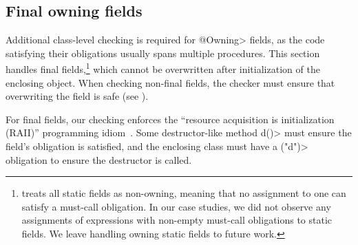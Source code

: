

\subsection{Final owning fields}
\label{sec:owning-fields}

  Additional class-level checking is required for \<@Owning>
  fields, as the code
  satisfying their \MustCall obligations usually spans multiple
  procedures.  This section handles final fields,\footnote{\Tool
    treats all static fields as non-owning, meaning that no assignment to one
    can satisfy a must-call obligation. In our case studies, we did
    not observe any assignments of expressions with non-empty must-call obligations
    to static fields. We leave handling owning static fields to future work.
  }
  which cannot be overwritten after initialization of the enclosing
  object.  When checking
  non-final fields, the checker must ensure
  that overwriting the field is safe
  (see ).

  For final fields, our checking enforces the ``resource acquisition is
  initialization (RAII)'' programming idiom~\cite{raii}.  Some
  destructor-like method \<d()> must ensure the field's \MustCall obligation is
  satisfied, and the enclosing class must have a \MustCall\<("d")> obligation to
  ensure the destructor is called.


